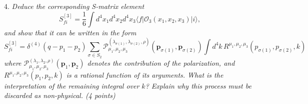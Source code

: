 4. \textit{Deduce the corresponding S-matrix element}
\begin{equation}
S_{fi}^{[3]} = \frac{1}{6} \int d^4x_1 d^4x_2 d^4x_3 \langle f | \mathcal{O}_3(x_1, x_2, x_3) | i \rangle,
\end{equation}
\textit{and show that it can be written in the form}
\begin{equation}
S_{fi}^{[3]} = \delta^{(4)}(q - p_1 - p_2) \sum_{\sigma \in S_2} \mathcal{P}^{(\lambda_{\sigma(1)}, \lambda_{\sigma(2)}, \rho)}_{\mu_1, \mu_2, \mu_3} (\mathbf{p}_{\sigma(1)}, \mathbf{p}_{\sigma(2)}) \int d^4k \, R^{\mu_1, \mu_2, \mu_3}(p_{\sigma(1)}, p_{\sigma(2)}, k)
\end{equation}
\textit{where $\mathcal{P}^{(\lambda_1, \lambda_2, \rho)}_{\mu_1, \mu_2, \mu_3} (\mathbf{p}_1, \mathbf{p}_2)$ denotes the contribution of the polarization, and $R^{\mu_1, \mu_2, \mu_3}(p_1, p_2, k)$ is a rational function of its arguments. What is the interpretation of the remaining integral over $k$? Explain why this process must be discarded as non-physical. (4 points)}